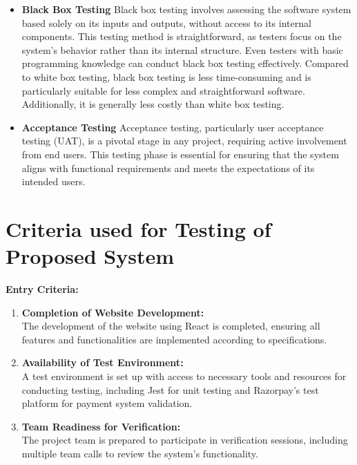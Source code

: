 \documentclass[12pt,a4paper]{report}
\begin{document}
\begin{itemize}
    \item \textbf{Black Box Testing}
          Black box testing involves assessing the software system based solely on its inputs and outputs, without access to its internal components. This testing method is straightforward, as testers focus on the system's behavior rather than its internal structure. Even testers with basic programming knowledge can conduct black box testing effectively. Compared to white box testing, black box testing is less time-consuming and is particularly suitable for less complex and straightforward software. Additionally, it is generally less costly than white box testing.
    \item \textbf{Acceptance Testing}
          Acceptance testing, particularly user acceptance testing (UAT), is a pivotal stage in any project, requiring active involvement from end users. This testing phase is essential for ensuring that the system aligns with functional requirements and meets the expectations of its intended users.
\end{itemize}

\section{Criteria used for Testing of Proposed System}


\textbf{Entry Criteria:}
\begin{enumerate}
    \item \textbf{Completion of Website Development:} \\
          The development of the website using React is completed, ensuring all features and functionalities are implemented according to specifications.

    \item \textbf{Availability of Test Environment:} \\
          A test environment is set up with access to necessary tools and resources for conducting testing, including Jest for unit testing and Razorpay's test platform for payment system validation.

    \item \textbf{Team Readiness for Verification:} \\
          The project team is prepared to participate in verification sessions, including multiple team calls to review the system's functionality.
\end{enumerate}
\end{document}
